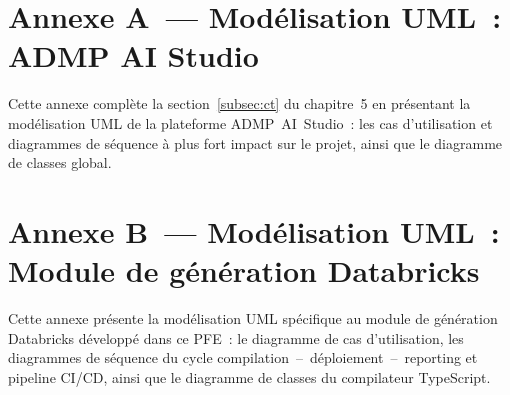 
\section{Annexe A~--- Modélisation UML~: ADMP AI Studio}
\label{annexe:uml}

Cette annexe complète la section~\ref{subsec:ct} du chapitre~5 en présentant la modélisation UML de la plateforme ADMP~AI~Studio~: les cas d'utilisation et diagrammes de séquence à plus fort impact sur le projet, ainsi que le diagramme de classes global.



\section{Annexe B~--- Modélisation UML~: Module de génération Databricks}
\label{annexe:uml-databricks}

Cette annexe présente la modélisation UML spécifique au module de génération Databricks développé dans ce PFE~: le diagramme de cas d'utilisation, les diagrammes de séquence du cycle compilation~--~déploiement~--~reporting et pipeline CI/CD, ainsi que le diagramme de classes du compilateur TypeScript.


